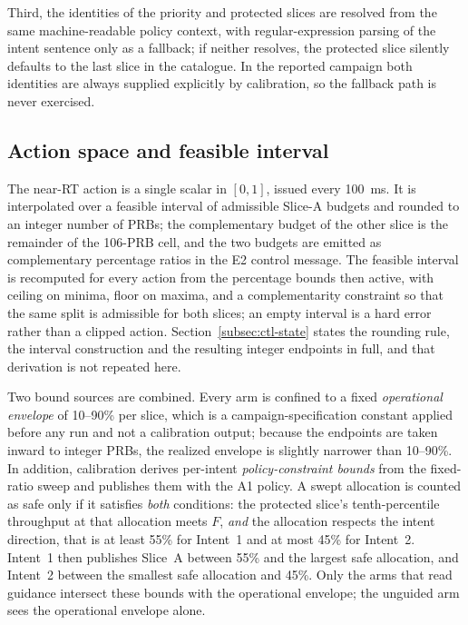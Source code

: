 Third, the identities of the priority and protected slices are resolved from the same machine-readable policy context, with regular-expression parsing of the intent sentence only as a fallback; if neither resolves, the protected slice silently defaults to the last slice in the catalogue. In the reported campaign both identities are always supplied explicitly by calibration, so the fallback path is never exercised.

\subsection{Action space and feasible interval}
The near-RT action is a single scalar in $[0,1]$, issued every 100~ms. It is interpolated over a feasible interval of admissible Slice-A budgets and rounded to an integer number of PRBs; the complementary budget of the other slice is the remainder of the 106-PRB cell, and the two budgets are emitted as complementary percentage ratios in the E2 control message. The feasible interval is recomputed for every action from the percentage bounds then active, with ceiling on minima, floor on maxima, and a complementarity constraint so that the same split is admissible for both slices; an empty interval is a hard error rather than a clipped action. Section~\ref{subsec:ctl-state} states the rounding rule, the interval construction and the resulting integer endpoints in full, and that derivation is not repeated here.

Two bound sources are combined. Every arm is confined to a fixed \emph{operational envelope} of 10--90\% per slice, which is a campaign-specification constant applied before any run and not a calibration output; because the endpoints are taken inward to integer PRBs, the realized envelope is slightly narrower than 10--90\%. In addition, calibration derives per-intent \emph{policy-constraint bounds} from the fixed-ratio sweep and publishes them with the A1 policy. A swept allocation is counted as safe only if it satisfies \emph{both} conditions: the protected slice's tenth-percentile throughput at that allocation meets $F$, \emph{and} the allocation respects the intent direction, that is at least 55\% for Intent~1 and at most 45\% for Intent~2. Intent~1 then publishes Slice~A between 55\% and the largest safe allocation, and Intent~2 between the smallest safe allocation and 45\%. Only the arms that read guidance intersect these bounds with the operational envelope; the unguided arm sees the operational envelope alone.

